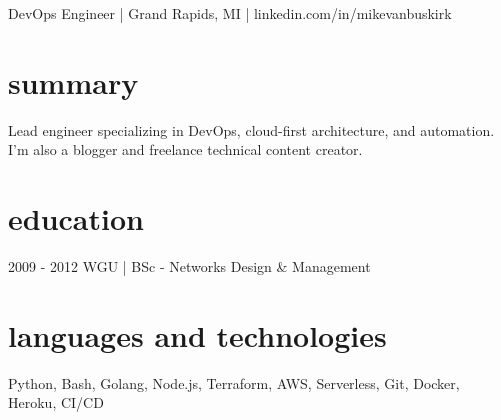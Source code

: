 \documentclass[]{mv_cv}
\begin{document}
       {DevOps Engineer | Grand Rapids, MI | linkedin.com/in/mikevanbuskirk}
 
\section{summary}
\begin{content}
  {
    Lead engineer specializing in DevOps, cloud-first architecture, and automation. I'm also a blogger and freelance technical content creator.
  }
\end{content}

\section{education}
\begin{content}
  {2009 - 2012 WGU | BSc - Networks Design \& Management}
\end{content}

\section{languages and technologies}
\begin{content}
  {Python, Bash, Golang, Node.js, Terraform, AWS, Serverless, Git, Docker, Heroku, CI/CD}
\end{content}

\end{document}
